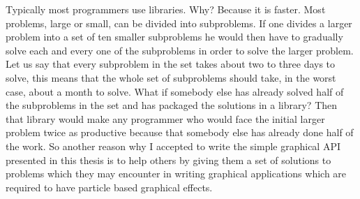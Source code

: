 Typically most programmers use libraries. Why? Because it is faster. Most problems, large or small, can be divided into subproblems. If one divides a larger problem into a set of ten smaller subproblems he would then have to gradually solve each and every one of the subproblems in order to solve the larger problem. Let us say that every subproblem in the set takes about two to three days to solve, this means that the whole set of subproblems should take, in the worst case, about a month to solve. What if somebody else has already solved half of the subproblems in the set and has packaged the solutions in a library? Then that library would make any programmer who would face the initial larger problem twice as productive because that somebody else has already done half of the work. So another reason why I accepted to write the simple graphical API presented in this thesis is to help others by giving them a set of solutions to problems which they may encounter in writing graphical applications which are required to have particle based graphical effects.